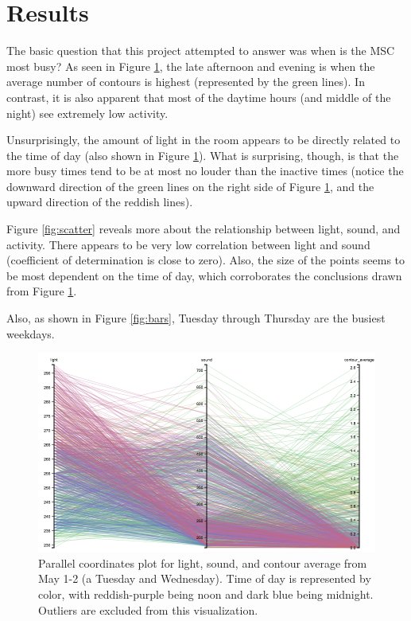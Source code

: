 
\section{Results}
\label{sec:results}

The basic question that this project attempted to answer was when is the MSC most busy? As seen in Figure \ref{fig:pcord}, the late afternoon and evening is when the average number of contours is highest (represented by the green lines). In contrast, it is also apparent that most of the daytime hours (and middle of the night) see extremely low activity.

Unsurprisingly, the amount of light in the room appears to be directly related to the time of day (also shown in Figure \ref{fig:pcord}). What is surprising, though, is that the more busy times tend to be at most no louder than the inactive times (notice the downward direction of the green lines on the right side of Figure \ref{fig:pcord}, and the upward direction of the reddish lines).

Figure \ref{fig:scatter} reveals more about the relationship between light, sound, and activity. There appears to be very low correlation between light and sound (coefficient of determination is close to zero). Also, the size of the points seems to be most dependent on the time of day, which corroborates the conclusions drawn from Figure \ref{fig:pcord}.

Also, as shown in Figure \ref{fig:bars}, Tuesday through Thursday are the busiest weekdays.

\begin{figure}[t]
    \centering
    \includegraphics[width=0.97\linewidth]{figs/parallel_cord.png}
    \caption{Parallel coordinates plot for light, sound, and contour average from May 1-2 (a Tuesday and Wednesday). Time of day is represented by color, with reddish-purple being noon and dark blue being midnight. Outliers are excluded from this visualization.}
    \label{fig:pcord}
\end{figure}

